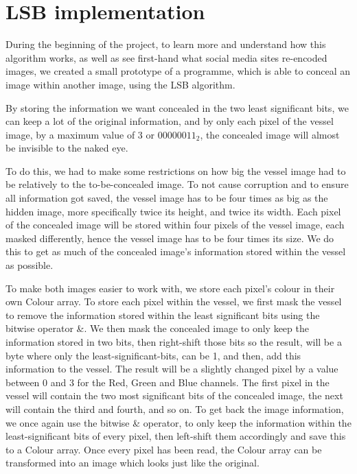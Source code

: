 \section{LSB implementation}
\label{sec:lsb-implementation}
During the beginning of the project, to learn more and understand how this algorithm works, as well as see first-hand what social media sites re-encoded images, we created a small prototype of a programme, which is able to conceal an image within another image, using the LSB algorithm. 

By storing the information we want concealed in the two least significant bits, we can keep a lot of the original information, and by only each pixel of the vessel image, by a maximum value of 3 or $00000011_2$, the concealed image will almost be invisible to the naked eye.

To do this, we had to make some restrictions on how big the vessel image had to be relatively to the to-be-concealed image. 
To not cause corruption and to ensure all information got saved, the vessel image has to be four times as big as the hidden image, more specifically twice its height, and twice its width. 
Each pixel of the concealed image will be stored within four pixels of the vessel image, each masked differently, hence the vessel image has to be four times its size. 
We do this to get as much of the concealed image's information stored within the vessel as possible.

To make both images easier to work with, we store each pixel's colour in their own Colour array. 
To store each pixel within the vessel, we first mask the vessel to remove the information stored within the least significant bits using the bitwise operator \&. 
We then mask the concealed image to only keep the information stored in two bits, then right-shift those bits so the result, will be a byte where only the least-significant-bits, can be 1, and then, add this information to the vessel. 
The result will be a slightly changed pixel by a value between 0 and 3 for the Red, Green and Blue channels. 
The first pixel in the vessel will contain the two most significant bits of the concealed image, the next will contain the third and fourth, and so on. 
To get back the image information, we once again use the bitwise \& operator, to only keep the information within the least-significant bits of every pixel, then left-shift them accordingly and save this to a Colour array. Once every pixel has been read, the Colour array can be transformed into an image which looks just like the original.

